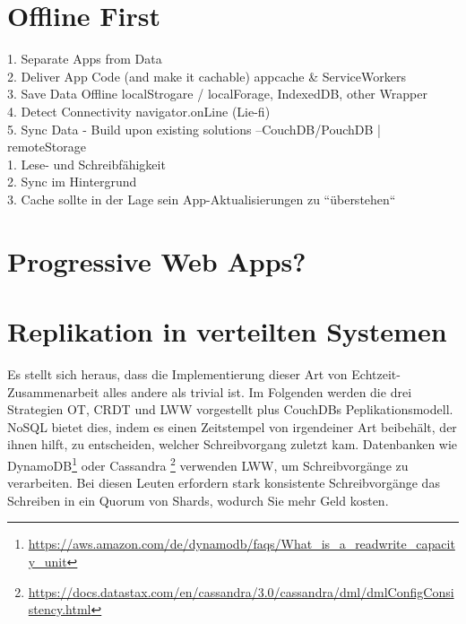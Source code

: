 \section{Offline First}
1. Separate Apps from Data\\
2. Deliver App Code (and make it cachable) {appcache \& ServiceWorkers}\\
3. Save Data Offline {localStrogare / localForage, IndexedDB, other Wrapper}\\
4. Detect Connectivity {navigator.onLine} (Lie-fi)\\
5. Sync Data - Build upon existing solutions --CouchDB/PouchDB | remoteStorage\\
%
%
1. Lese- und Schreibfähigkeit\\
2. Sync im Hintergrund\\
3. Cache sollte in der Lage sein App-Aktualisierungen zu ``überstehen``
%
%
\section{Progressive Web Apps?}
%
%
\section{Replikation in verteilten Systemen}
Es stellt sich heraus, dass die Implementierung dieser Art von Echtzeit-Zusammenarbeit alles andere als trivial ist.
Im Folgenden werden die drei Strategien \gls{OT}, \gls{CRDT} und \gls{LWW} vorgestellt plus CouchDBs Peplikationsmodell.
%
%
NoSQL bietet dies, indem es einen Zeitstempel von irgendeiner Art beibehält, der ihnen hilft, zu entscheiden, welcher Schreibvorgang zuletzt kam. Datenbanken wie DynamoDB\footnote{\url{https://aws.amazon.com/de/dynamodb/faqs/What_is_a_readwrite_capacity_unit}} oder Cassandra \footnote{\url{https://docs.datastax.com/en/cassandra/3.0/cassandra/dml/dmlConfigConsistency.html}} verwenden LWW, um Schreibvorgänge zu verarbeiten. Bei diesen Leuten erfordern stark konsistente Schreibvorgänge das Schreiben in ein Quorum von Shards, wodurch Sie mehr Geld kosten.
%
%

%
%

%
%

